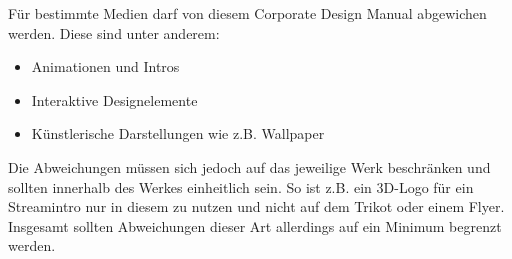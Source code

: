 \documentclass{article}
\begin{document}
Für bestimmte Medien darf von diesem Corporate Design Manual abgewichen werden. Diese sind unter anderem:

\begin{itemize}
\item Animationen und Intros
\item Interaktive Designelemente
\item Künstlerische Darstellungen wie z.B. Wallpaper
\end{itemize}

Die Abweichungen müssen sich jedoch auf das jeweilige Werk beschränken und sollten innerhalb des Werkes einheitlich sein. So ist z.B. ein 3D-Logo für ein Streamintro nur in diesem zu nutzen und nicht auf dem Trikot oder einem Flyer. Insgesamt sollten Abweichungen dieser Art allerdings auf ein Minimum begrenzt werden.
\end{document}

